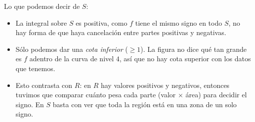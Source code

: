 \begin{respuesta}
    Lo que podemos decir de $S$:
    \begin{itemize}
        \item La integral sobre $S$ es positiva, como $f$ tiene el mismo signo en todo $S$, no hay forma de que haya cancelación entre partes positivas y negativas.
        \item Sólo podemos dar una \emph{cota inferior} ($\geq 1$). La figura no dice qué
              tan grande es $f$ adentro de la curva de nivel $4$, así que no hay cota
              superior con los datos que tenemos.
        \item Esto contrasta con $R$: en $R$ hay valores positivos y negativos, entonces
              tuvimos que comparar cuánto pesa cada parte (valor $\times$ área) para
              decidir el signo. En $S$ basta con ver que toda la región está en una zona
              de un solo signo.
    \end{itemize}
\end{respuesta}
